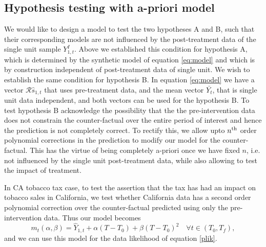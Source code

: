 \documentclass{article}
\begin{document}
\subsection{Hypothesis testing with a-priori model}
\label{sec:hypothesis2d}
We would like to design a model to 
test the two hypotheses A and B, such that their corresponding models are not influenced by the post-treatment data of the single unit sample $Y^I_{1, t}$. Above we established this condition for hypothesis A, which is determined by the synthetic model of equation \ref{eq:model} and which is by construction 
independent of post-treatment data of single unit. 
We wish to establish the same condition for hypothesis B. In equation \ref{eq:model} we have a vector $\mathcal{R}\hat{s}_{1, t}$ that uses pre-treatment data, and the mean vector $\bar{Y_t}$, that is single unit data independent, and both vectors can be used for the hypothesis B. 
To test hypothesis B acknowledge the possibility that the the pre-intervention data does not constrain the counter-factual over the entire period of interest and hence the prediction is not completely correct. To rectify this, we allow upto $n^{\rm th}$ order polynomial corrections in the prediction to modify our model for the counter-factual. This has the virtue of being 
completely a-priori once we have fixed $n$, i.e. not influenced by the single unit post-treatment data, while also allowing to test the impact of treatment. 

In CA tobacco tax case, to test the assertion that the tax has had an impact on tobacco sales in California, we test whether California data has a second order polynomial correction over the counter-factual predicted using only the pre-intervention data. 
Thus our model becomes 
\begin{equation}
    m_t(\alpha,\beta) = \hat{Y}_{1, t}  + \alpha (T-T_0) + \beta (T-T_0)^2 \quad \forall  t \in (T_0, T_f),
    \label{eq:model2d}
\end{equation}
and we can use this model for the data likelihood of equation \ref{plik}. 
\end{document}
